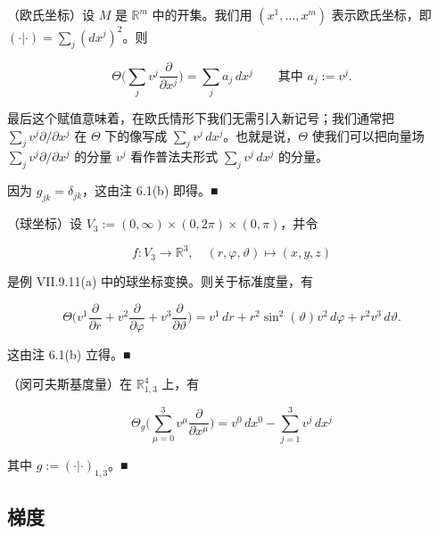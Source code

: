 \begin{example}

\begin{items}
\item

（欧氏坐标）设 $ M $ 是 $ \mathbb{R}^{m} $ 中的开集。我们用 $ (x^{1}, \dots, x^{m}) $ 表示欧氏坐标，即 $ (\cdot|\cdot) = \sum_{j}(dx^{j})^{2} $。则

\[
\Theta\Big(\sum_{j} v^{j}\frac{\partial}{\partial x^{j}}\Big) = \sum_{j} a_{j}\,dx^{j} \qquad \text{其中 } a_{j} := v^{j}.
\]

最后这个赋值意味着，在欧氏情形下我们无需引入新记号；我们通常把 $ \sum_{j} v^{j}\partial/\partial x^{j} $ 在 $ \Theta $ 下的像写成 $ \sum_{j} v^{j}\,dx^{j} $。也就是说，$ \Theta $ 使我们可以把向量场 $ \sum_{j} v^{j}\partial/\partial x^{j} $ 的分量 $ v^{j} $ 看作普法夫形式 $ \sum_{j} v^{j}\,dx^{j} $ 的分量。

\proofhead
因为 $ g_{jk} = \delta_{jk} $，这由注 6.1(b) 即得。\nobreak\hspace{0.35em}■
\item

（球坐标）设 $ V_{3} := (0, \infty) \times (0, 2\pi) \times (0, \pi) $，并令

\[
f: V_{3} \to \mathbb{R}^{3}, \quad (r, \varphi, \vartheta) \mapsto (x, y, z)
\]

是例 VII.9.11(a) 中的球坐标变换。则关于标准度量，有

\[
\Theta\Big(v^{1}\frac{\partial}{\partial r} + v^{2}\frac{\partial}{\partial \varphi} + v^{3}\frac{\partial}{\partial \vartheta}\Big) = v^{1}\,dr + r^{2}\sin^{2}(\vartheta)v^{2}\,d\varphi + r^{2}v^{3}\,d\vartheta.
\]

\proofhead
这由注 6.1(b) 立得。\nobreak\hspace{0.35em}■
\item

（闵可夫斯基度量）在 $ \mathbb{R}^{4}_{1,3} $ 上，有

\[
\Theta_{g}\Big(\sum_{\mu=0}^{3} v^{\mu}\frac{\partial}{\partial x^{\mu}}\Big) = v^{0}\,dx^{0} - \sum_{j=1}^{3} v^{j}\,dx^{j}
\]

其中 $ g := (\cdot|\cdot)_{1,3} $。\nobreak\hspace{0.35em}■

\end{items}

\end{example}

\subsection*{梯度}

